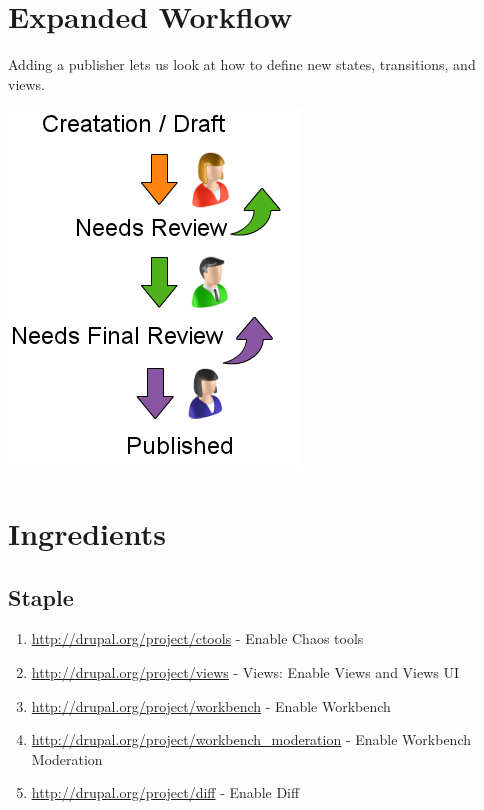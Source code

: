 \documentclass[letterpaper,10pt,english]{sphinxmanual}
\begin{document}
\section{Expanded Workflow}
\label{workbench:expanded-workflow}
Adding a publisher lets us look at how to define new states, transitions, and views.

\includegraphics{workflow.png}


\section{Ingredients}
\label{workbench:ingredients}

\subsection{Staple}
\label{workbench:staple}\begin{enumerate}
\item {} 
\href{http://drupal.org/project/ctools}{http://drupal.org/project/ctools} - Enable Chaos tools

\item {} 
\href{http://drupal.org/project/views}{http://drupal.org/project/views} - Views: Enable Views and Views UI

\item {} 
\href{http://drupal.org/project/workbench}{http://drupal.org/project/workbench} - Enable Workbench

\item {} 
\href{http://drupal.org/project/workbench\_moderation}{http://drupal.org/project/workbench\_moderation} - Enable Workbench Moderation

\item {} 
\href{http://drupal.org/project/diff}{http://drupal.org/project/diff} - Enable Diff

\end{enumerate}
\end{document}
